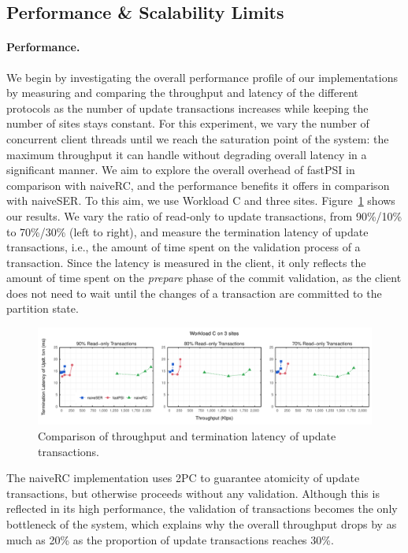 \subsection{Performance \& Scalability Limits}

\paragraph{Performance.} We begin by investigating the overall performance profile of our implementations by measuring and comparing the throughput and latency of the different protocols as the number of update transactions increases while keeping the number of sites stays constant. For this experiment, we vary the number of concurrent client threads until we reach the saturation point of the system: the maximum throughput it can handle without degrading overall latency in a significant manner. We aim to explore the overall overhead of fastPSI in comparison with naiveRC, and the performance benefits it offers in comparison with naiveSER. To this aim, we use Workload C and three sites. Figure~\ref{fig:general_bench} shows our results. We vary the ratio of read-only to update transactions, from 90\%/10\% to 70\%/30\% (left to right), and measure the termination latency of update transactions, i.e., the amount of time spent on the validation process of a transaction. Since the latency is measured in the client, it only reflects the amount of time spent on the \emph{prepare} phase of the commit validation, as the client does not need to wait until the changes of a transaction are committed to the partition state.

\begin{figure}[t]
\vspace{-0.5cm}
\includegraphics[width=\textwidth]{figures/general_bench.pdf}
\vspace{-1cm}
\caption{Comparison of throughput and termination latency of update transactions.}
\label{fig:general_bench}
\end{figure}

The naiveRC implementation uses 2PC to guarantee atomicity of update transactions, but otherwise proceeds without any validation. Although this is reflected in its high performance, the validation of transactions becomes the only bottleneck of the system, which explains why the overall throughput drops by as much as 20\% as the proportion of update transactions reaches 30\%.

